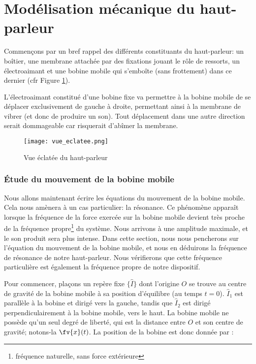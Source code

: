 

\section{Modélisation mécanique du haut-parleur}
Commençons par un bref rappel des différents constituants du haut-parleur:
un boîtier, une membrane attachée par des fixations jouant le rôle de ressorts, 
un électroaimant et une bobine mobile qui s'emboîte (sans frottement)
dans ce dernier (cfr Figure \ref{vueeclatee}).

L'électroaimant constitué d'une bobine fixe va permettre à la bobine mobile de se déplacer exclusivement de gauche
à droite, permettant ainsi à la membrane de vibrer (et donc de produire un son). Tout déplacement dans une autre direction serait dommageable car risquerait d'abîmer la membrane.

\begin{figure}[ht!]
\centering
\texttt{[image: vue\_eclatee.png]}
\caption{Vue éclatée du haut-parleur}
\label{vueeclatee}
\end{figure}

\subsubsection{Étude du mouvement de la bobine mobile}
Nous allons maintenant écrire les équations du mouvement de la bobine mobile. Cela nous amènera à un cas 
particulier: la résonance. Ce phénomène apparaît lorsque la fréquence de la force exercée sur la bobine 
mobile devient très proche de la fréquence propre\footnote{fréquence naturelle, sans force extérieure} 
du système\cite{resonance}. Nous arrivons à une amplitude maximale, et le son produit sera plus intense.
Dans cette section, nous nous pencherons sur l'équation du mouvement de la bobine mobile, et nous en
déduirons la fréquence de résonance de notre haut-parleur. Nous vérifierons que cette fréquence particulière
est également la fréquence propre de notre dispositif.


Pour commencer, plaçons un repère fixe $\{\hat{I}\}$ dont l'origine $O$ se trouve
au centre de gravité de la bobine mobile à sa position d'équilibre (au
temps $t=0$). $\hat{I}_1$ est parallèle à la bobine et dirigé vers la gauche, tandis que
$\hat{I}_2$ est dirigé perpendiculairement à la bobine mobile, vers le haut.
La bobine mobile ne possède qu'un seul degré de liberté, qui
est la distance entre $O$ et son centre de gravité; notons-la $\fv{x}(t)$.
La position de la bobine est donc donnée par :

